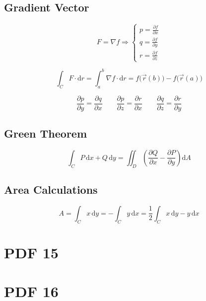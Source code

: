 \documentclass[12pt, fleqn]{book}
\begin{document}
    \section{Gradient Vector}
		\begin{equation}
			F = \nabla f \Rightarrow
			\begin{cases}
				p = \frac{\partial f}{\partial x} \\
				q = \frac{\partial f}{\partial y} \\
				r = \frac{\partial f}{\partial z} 
			\end{cases}
		\end{equation} 
		
		\begin{equation}
			\int_{C} F \cdot \mathrm{d}r = \int_{a}^{b} \nabla f \cdot \mathrm{d}r = f\big(\vec{r}(b)\big) - f\big(\vec{r}(a)\big)
		\end{equation}     
		
		\begin{equation}
			\frac{\partial p}{\partial y} = \frac{\partial q}{\partial x} \qquad
			\frac{\partial p}{\partial z} = \frac{\partial r}{\partial x} \qquad
			\frac{\partial q}{\partial z} = \frac{\partial r}{\partial y}
		\end{equation}
		
		\section{Green Theorem}
		\begin{equation}
			\int_{C} P \, \mathrm{d}x + Q \, \mathrm{d}y = \iint_{D} \left(\frac{\partial Q}{\partial x} - \frac{\partial P}{\partial y}\right) \mathrm{d}A
		\end{equation}
		
		\section{Area Calculations}
		\begin{equation}
			A = \int_{C} x \, \mathrm{d}y = - \int_{C} y \, \mathrm{d}x = \frac{1}{2} \int_{C} x \, \mathrm{d}y - y \, \mathrm{d}x
		\end{equation}

\chapter{PDF 15}\label{pdf15}
\chapter{PDF 16}\label{pdf16}
\end{document}
